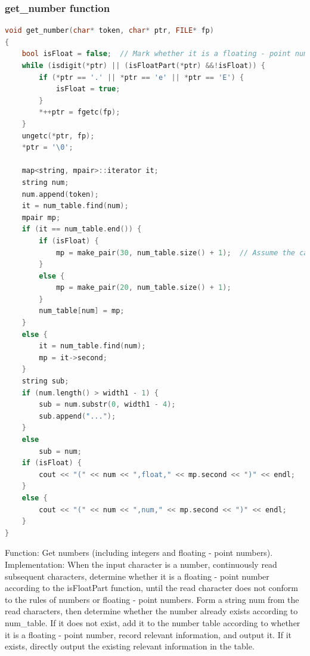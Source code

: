 \documentclass[a4paper,12pt]{article}
\begin{document}
\subsubsection{get\_number function}
\begin{lstlisting}[language=c++]
void get_number(char* token, char* ptr, FILE* fp)
{
    bool isFloat = false;  // Mark whether it is a floating - point number
    while (isdigit(*ptr) || (isFloatPart(*ptr) &&!isFloat)) {
        if (*ptr == '.' || *ptr == 'e' || *ptr == 'E') {
            isFloat = true;
        }
        *++ptr = fgetc(fp);
    }
    ungetc(*ptr, fp);
    *ptr = '\0';

    map<string, mpair>::iterator it;
    string num;
    num.append(token);
    it = num_table.find(num);
    mpair mp;
    if (it == num_table.end()) {
        if (isFloat) {
            mp = make_pair(30, num_table.size() + 1);  // Assume the category number of floating - point numbers is 30, which can be adjusted according to the actual situation
        }
        else {
            mp = make_pair(20, num_table.size() + 1);
        }
        num_table[num] = mp;
    }
    else {
        it = num_table.find(num);
        mp = it->second;
    }
    string sub;
    if (num.length() > width1 - 1) {
        sub = num.substr(0, width1 - 4);
        sub.append("...");
    }
    else
        sub = num;
    if (isFloat) {
        cout << "(" << num << ",float," << mp.second << ")" << endl;
    }
    else {
        cout << "(" << num << ",num," << mp.second << ")" << endl;
    }
}
\end{lstlisting}
Function: Get numbers (including integers and floating - point numbers).
Implementation: When the input character is a number, continuously read subsequent characters, determine whether it is a floating - point number according to the isFloatPart function, until the read character does not conform to the rules of numbers or floating - point numbers. Form a string num from the read characters, then determine whether the number already exists according to num\_table. If it does not exist, add it to the number table according to whether it is a floating - point number, record relevant information, and output it. If it exists, directly output the existing relevant information in the table.
\end{document}
